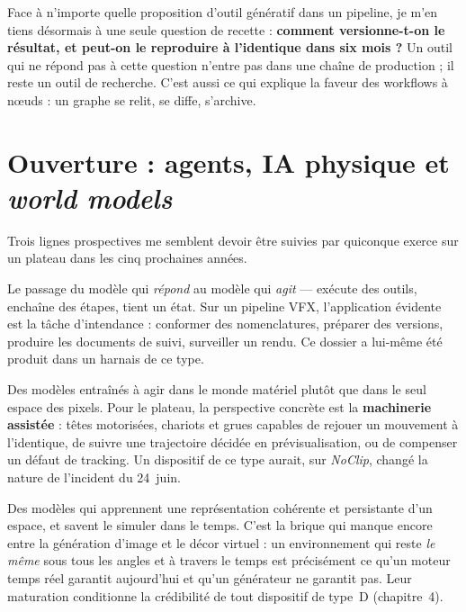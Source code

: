 \documentclass[11pt,a4paper]{report}
\begin{document}
\begin{notebox}[title={La question qui tranche}]
Face à n'importe quelle proposition d'outil génératif dans un pipeline, je m'en tiens désormais à
une seule question de recette : \textbf{comment versionne-t-on le résultat, et peut-on le
reproduire à l'identique dans six mois ?} Un outil qui ne répond pas à cette question n'entre pas
dans une chaîne de production ; il reste un outil de recherche. C'est aussi ce qui explique la
faveur des workflows à n\oe uds : un graphe se relit, se diffe, s'archive.
\end{notebox}

\section{Ouverture : agents, IA physique et \emph{world models}}
Trois lignes prospectives me semblent devoir être suivies par quiconque exerce sur un plateau
dans les cinq prochaines années.

\begin{description}[leftmargin=2.6cm,style=nextline,font=\bfseries\color{braccent}]
\item[Agents IA] Le passage du modèle qui \emph{répond} au modèle qui \emph{agit} --- exécute
des outils, enchaîne des étapes, tient un état. Sur un pipeline VFX, l'application évidente est la
tâche d'intendance : conformer des nomenclatures, préparer des versions, produire les documents
de suivi, surveiller un rendu. Ce dossier a lui-même été produit dans un harnais de ce type.
\item[IA physique] Des modèles entraînés à agir dans le monde matériel plutôt que dans le seul
espace des pixels. Pour le plateau, la perspective concrète est la \textbf{machinerie assistée} :
têtes motorisées, chariots et grues capables de rejouer un mouvement à l'identique, de suivre une
trajectoire décidée en prévisualisation, ou de compenser un défaut de tracking. Un dispositif de
ce type aurait, sur \textit{NoClip}, changé la nature de l'incident du 24~juin.
\item[\emph{World models}] Des modèles qui apprennent une représentation cohérente et
persistante d'un espace, et savent le simuler dans le temps. C'est la brique qui manque encore
entre la génération d'image et le décor virtuel : un environnement qui reste \emph{le même} sous
tous les angles et à travers le temps est précisément ce qu'un moteur temps réel garantit
aujourd'hui et qu'un générateur ne garantit pas. Leur maturation conditionne la crédibilité de
tout dispositif de type~D (chapitre~4).
\end{description}
\end{document}
